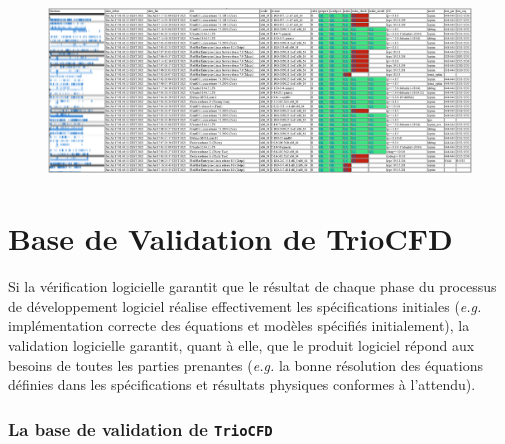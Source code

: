 \begin{figure}[H]
   \centering
   \includegraphics[width=23cm ,angle =90]{pictures/trio_verif_flou.png}
   \vspace*{0.2cm}
\end{figure}





\chapter{\label{chapitre:validation}Base de Validation de TrioCFD}
Si la v\'erification logicielle garantit que le r\'esultat de chaque phase du processus de d\'eveloppement logiciel r\'ealise effectivement les sp\'ecifications initiales (\textit{e.g.} impl\'ementation correcte des \'equations et mod\`eles sp\'ecifi\'es initialement), la validation logicielle garantit, quant \`a elle, que le produit logiciel r\'epond aux besoins de toutes les parties prenantes (\textit{e.g.} la bonne r\'esolution des \'equations d\'efinies dans les sp\'ecifications et r\'esultats physiques conformes \`a l'attendu).

\subsection{La base de validation de \texttt{TrioCFD}}

